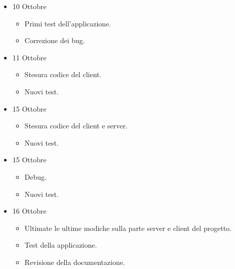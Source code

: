 \begin{itemize}
\begin{itemize}
\end{itemize}

\item 10 Ottobre
\begin{itemize} 
	\item Primi test dell'applicazione.
	\item Correzione dei bug.
	
\end{itemize}

\item 11 Ottobre
\begin{itemize} 
	\item Stesura codice del client.
	\item Nuovi test.
	
\end{itemize}

\item 15 Ottobre
\begin{itemize} 
	\item Stesura codice del client e server.
	\item Nuovi test.
	
\end{itemize}

\item 15 Ottobre
\begin{itemize} 
	\item Debug.
	\item Nuovi test.
	
\end{itemize}

\item 16 Ottobre
\begin{itemize} 
	\item Ultimate le ultime modiche sulla parte server e client del progetto.
	\item Test della applicazione.
	\item Revisione della documentazione.
	
\end{itemize}	
\end{itemize}


